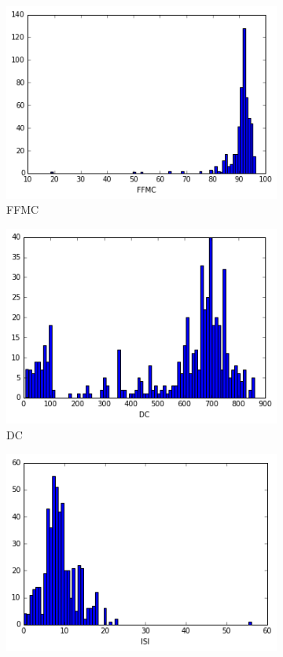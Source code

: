 \begin{figure}[!ht]
\begin{subfigure}[b]{.45\linewidth}
\includegraphics[width=\linewidth]{fig/hist/FFMC.png}
\caption{FFMC}\label{fig:gull}
\end{subfigure}
\begin{subfigure}[b]{.45\linewidth}
\includegraphics[width=\linewidth]{fig/hist/DC.png}
\caption{DC}\label{fig:tiger}
\end{subfigure}
\begin{subfigure}[b]{.45\linewidth}
\includegraphics[width=\linewidth]{fig/hist/ISI.png}

\end{subfigure}
\end{figure}
